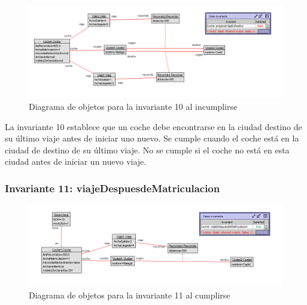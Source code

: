 \documentclass[12pt.a4paper]{article}
\begin{document}
\begin{figure}[H]
     \includegraphics[width=1\linewidth]{Soils/10_v2.png}
     \caption{Diagrama de objetos para la invariante 10 al incumplirse}
\end{figure}

La invariante 10 establece que un coche debe encontrarse en la ciudad destino de su último viaje antes de iniciar uno nuevo. Se cumple cuando el coche está en la ciudad de destino de su último viaje. No se cumple si el coche no está en esta ciudad antes de iniciar un nuevo viaje.

\subsubsection{Invariante 11: viajeDespuesdeMatriculacion}
    \begin{figure}[H]
         \centering
         \includegraphics[width=1\linewidth]{Soils/11.png}
         \caption{Diagrama de objetos para la invariante 11 al cumplirse}
    \end{figure} 
\end{document}
